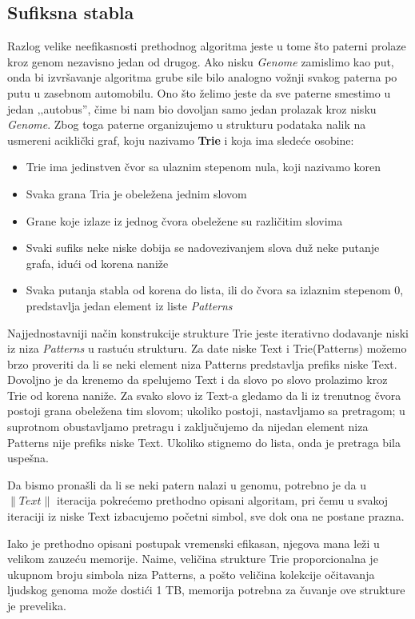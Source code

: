 \subsection{Sufiksna stabla}
Razlog velike neefikasnosti prethodnog algoritma jeste u tome što paterni prolaze kroz genom nezavisno jedan od drugog. Ako nisku \textit{Genome} zamislimo kao put, onda bi izvršavanje algoritma grube sile bilo analogno vožnji svakog paterna po putu u zasebnom automobilu. Ono što želimo jeste da sve paterne smestimo u jedan ‚‚autobus'', čime bi nam bio dovoljan samo jedan prolazak kroz nisku \textit{Genome}. Zbog toga paterne organizujemo u strukturu podataka nalik na usmereni aciklički graf, koju nazivamo \textbf{Trie} i koja ima sledeće osobine:

\begin{itemize}
    \item Trie ima jedinstven čvor sa ulaznim stepenom nula, koji nazivamo koren
    \item Svaka grana Tria je obeležena jednim slovom
    \item Grane koje izlaze iz jednog čvora obeležene su različitim slovima
    \item Svaki sufiks neke niske dobija se nadovezivanjem slova duž neke putanje grafa, idući od korena naniže
    \item Svaka putanja stabla od korena do lista, ili do čvora sa izlaznim stepenom 0, predstavlja jedan element iz liste \textit{Patterns}
\end{itemize}

Najjednostavniji način konstrukcije strukture Trie jeste iterativno dodavanje niski iz niza \textit{Patterns} u rastuću strukturu. Za date niske Text i Trie(Patterns) možemo brzo proveriti da li se neki element niza Patterns predstavlja prefiks niske Text. Dovoljno je da krenemo da spelujemo Text i da slovo po slovo prolazimo kroz Trie od korena naniže. Za svako slovo iz Text-a gledamo da li iz trenutnog čvora postoji grana obeležena tim slovom; ukoliko postoji, nastavljamo sa pretragom; u suprotnom obustavljamo pretragu i zaključujemo da nijedan element niza Patterns nije prefiks niske Text. Ukoliko stignemo do lista, onda je pretraga bila uspešna.

Da bismo pronašli da li se neki patern nalazi u genomu, potrebno je da u $\|Text\|$ iteracija pokrećemo prethodno opisani algoritam, pri čemu u svakoj iteraciji iz niske Text izbacujemo početni simbol, sve dok ona ne postane prazna.

Iako je prethodno opisani postupak vremenski efikasan, njegova mana leži u velikom zauzeću memorije. Naime, veličina strukture Trie proporcionalna je  ukupnom broju simbola niza Patterns, a pošto veličina kolekcije očitavanja ljudskog genoma može dostići 1 TB, memorija potrebna za čuvanje ove strukture je prevelika.


